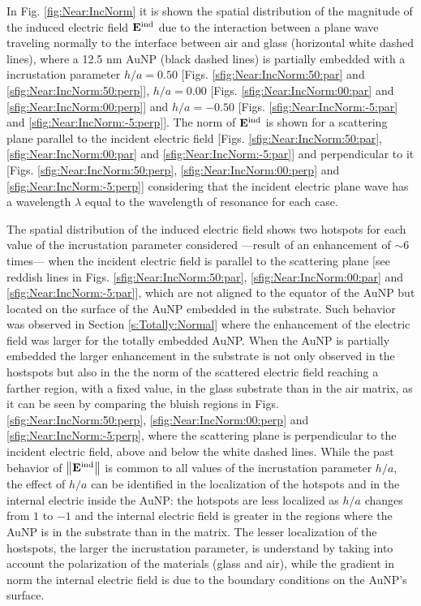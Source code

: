 In Fig. \ref{fig:Near:IncNorm} it is shown the spatial distribution of the magnitude of the induced electric field $\vb{E}^\text{ind}$ due to the interaction between a plane wave traveling normally to the interface between air and glass (horizontal white dashed lines), where a 12.5 nm AuNP (black dashed lines) is partially embedded with a incrustation parameter $h/a = 0.50$ [Figs. \ref{sfig:Near:IncNorm:50:par} and \ref{sfig:Near:IncNorm:50:perp}], $h/a = 0.00$ [Figs. \ref{sfig:Near:IncNorm:00:par} and \ref{sfig:Near:IncNorm:00:perp}] and $h/a = - 0.50$ [Figs. \ref{sfig:Near:IncNorm:-5:par} and \ref{sfig:Near:IncNorm:-5:perp}]. The norm of $\vb{E}^\text{ind}$ is shown for a scattering plane parallel to the incident electric field [Figs. \ref{sfig:Near:IncNorm:50:par}, \ref{sfig:Near:IncNorm:00:par} and \ref{sfig:Near:IncNorm:-5:par}] and perpendicular to it [Figs. \ref{sfig:Near:IncNorm:50:perp}, \ref{sfig:Near:IncNorm:00:perp} and \ref{sfig:Near:IncNorm:-5:perp}] considering that the incident electric plane wave has a wavelength $\lambda$ equal to the wavelength of resonance for each case.

The spatial distribution of the induced electric field shows two hotspots for each value of the incrustation parameter considered ---result of an enhancement of $\sim 6$ times--- when the incident electric field is parallel to the scattering plane [see reddish lines in Figs.  \ref{sfig:Near:IncNorm:50:par}, \ref{sfig:Near:IncNorm:00:par} and \ref{sfig:Near:IncNorm:-5:par}], which are not aligned to the equator of the AuNP but located on the surface of the AuNP embedded in the substrate. Such behavior was observed in Section \ref{s:Totally:Normal} where the enhancement of the electric field was larger for the totally embedded AuNP. When the AuNP is partially  embedded the larger enhancement in the substrate is not only observed in the hostspots but also in the the norm of the scattered electric field reaching a farther region, with a fixed value, in the glass substrate than in the air matrix, as it can be seen by comparing the bluish regions in Figs. \ref{sfig:Near:IncNorm:50:perp}, \ref{sfig:Near:IncNorm:00:perp} and \ref{sfig:Near:IncNorm:-5:perp}, where the scattering plane is perpendicular to the incident electric field, above and below the white dashed lines. While the past behavior of $\norm{ \vb{E}^\text{ind}}$ is common to all values of the incrustation parameter $h/a$, the effect of $h/a$ can be identified in the localization of the hotspots and in the internal electric inside the AuNP: the hotspots are less localized as $h/a$ changes from $1$ to $-1$ and the internal electric field is greater in the regions where the AuNP is in the substrate than in the matrix. The lesser localization of the hostspots, the larger the incrustation parameter, is understand by taking into account the polarization of the materials (glass and air), while the gradient in norm the internal electric field is due to the boundary conditions on the AuNP's surface.

